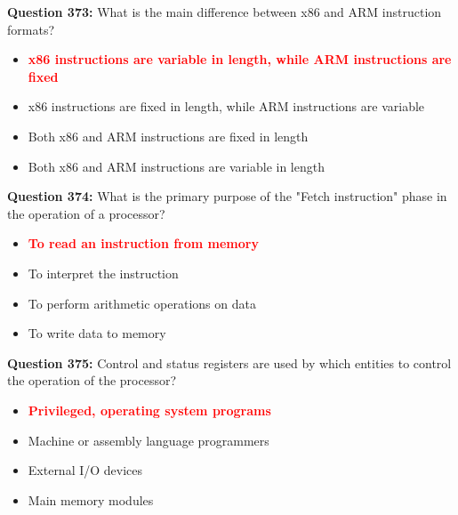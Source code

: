 \documentclass[12pt,a4paper]{article}
\begin{document}
\vspace{0.5cm}

\textbf{Question 373:} What is the main difference between x86 and ARM instruction formats?

\begin{itemize}
    \item[\textbf{A.}] \textcolor{red}{\textbf{x86 instructions are variable in length, while ARM instructions are fixed}}
    \item[\textbf{B.}] x86 instructions are fixed in length, while ARM instructions are variable
    \item[\textbf{C.}] Both x86 and ARM instructions are fixed in length
    \item[\textbf{D.}] Both x86 and ARM instructions are variable in length
\end{itemize}

\vspace{0.5cm}

\textbf{Question 374:} What is the primary purpose of the "Fetch instruction" phase in the operation of a processor?

\begin{itemize}
    \item[\textbf{A.}] \textcolor{red}{\textbf{To read an instruction from memory}}
    \item[\textbf{B.}] To interpret the instruction
    \item[\textbf{C.}] To perform arithmetic operations on data
    \item[\textbf{D.}] To write data to memory
\end{itemize}

\vspace{0.5cm}

\textbf{Question 375:} Control and status registers are used by which entities to control the operation of the processor?

\begin{itemize}
    \item[\textbf{A.}] \textcolor{red}{\textbf{Privileged, operating system programs}}
    \item[\textbf{B.}] Machine or assembly language programmers
    \item[\textbf{C.}] External I/O devices
    \item[\textbf{D.}] Main memory modules
\end{itemize}

\vspace{0.5cm}
\end{document}
